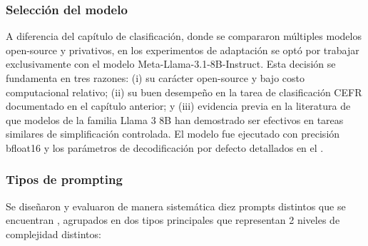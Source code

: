 \subsubsection*{Selección del modelo}
A diferencia del capítulo de clasificación, donde se compararon múltiples modelos open-source y privativos, en los experimentos de adaptación se optó por trabajar exclusivamente con el modelo Meta-Llama-3.1-8B-Instruct. Esta decisión se fundamenta en tres razones: (i) su carácter open-source y bajo costo computacional relativo; (ii) su buen desempeño en la tarea de clasificación CEFR documentado en el capítulo anterior; y (iii) evidencia previa en la literatura de que modelos de la familia Llama 3 8B han demostrado ser efectivos en tareas similares de simplificación controlada. El modelo fue ejecutado con precisión bfloat16 y los parámetros de decodificación por defecto detallados en el .

\subsubsection*{Tipos de prompting}
Se diseñaron y evaluaron de manera sistemática diez prompts distintos que se encuentran , agrupados en dos tipos principales que representan 2 niveles de complejidad distintos:

